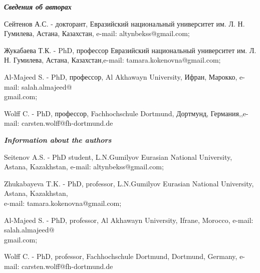 \emph{{\bfseries Сведения об авторах}}
\begin{noparindent}

Сейтенов А.С. - докторант, Евразийский национальный университет им. Л.
Н. Гумилева, Астана, Казахстан, e-mail: altynbekss@gmail.com;

Жукабаева Т.К. - PhD, профессор Евразийский национальный университет им.
Л. Н. Гумилева, Астана, Казахстан,e-mail: tamara.kokenovna@gmail.com;

Al-Majeed S. - PhD, профессор, Al Akhawayn University, Ифран, Марокко,
e-mail: salah.almajeed@\\gmail.com;

Wolff C. - PhD, профессор, Fachhochschule Dortmund, Дортмунд,
Германия,,e-mail: carsten.wolff@fh-dortmund.de
\end{noparindent}

\emph{{\bfseries Information about the authors}}
\begin{noparindent}

Seitenov A.S. - PhD student, L.N.Gumilyov Eurasian National University,
Astana, Kazakhstan, e-mail: altynbekss@gmail.com;

Zhukabayeva T.K. - PhD, professor, L.N.Gumilyov Eurasian National
University, Astana, Kazakhstan, \\e-mail: tamara.kokenovna@gmail.com;

Al-Majeed S. - PhD, professor, Al Akhawayn University, Ifrane, Morocco,
e-mail: salah.almajeed@\\gmail.com;

Wolff C. - PhD, professor, Fachhochschule Dortmund, Dortmund, Germany,
e-mail: carsten.wolff@fh-dortmund.de
\end{noparindent}
